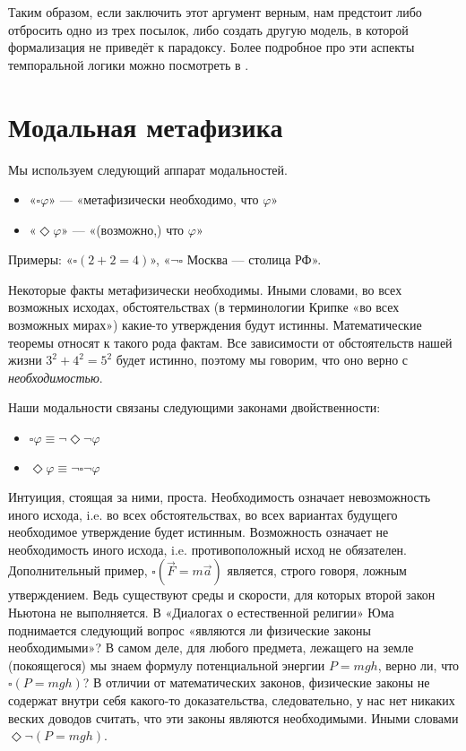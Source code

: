 \documentclass[openany]{book}
\theoremstyle{plain}
\theoremstyle{definition}
\begin{document}
Таким образом, если заключить этот аргумент верным, нам предстоит либо отбросить одно из трех посылок, либо создать другую модель, в которой формализация не приведёт к парадоксу. Более подробное про эти аспекты темпоральной логики можно посмотреть в \cite{Goranko}.

\chapter{ Модальная метафизика }

Мы используем следующий аппарат модальностей.
\begin{itemize}
\item «\(\square \varphi\)» — «метафизически необходимо, что \(\varphi\)»
\item «\(\Diamond \varphi\)» — «(возможно,) что \(\varphi\)»
\end{itemize}

Примеры: «\(\square (2+2=4)\)», «\(\neg \square\) Москва — столица РФ».

Некоторые факты метафизически необходимы. Иными словами, во всех возможных исходах, обстоятельствах (в терминологии Крипке «во всех возможных мирах») какие-то утверждения будут истинны. Математические теоремы относят к такого рода фактам. Все зависимости от обстоятельств нашей жизни \(3^2 + 4^2 = 5^2\) будет истинно, поэтому мы говорим, что оно верно с \textit{необходимостью}.

Наши модальности связаны следующими законами двойственности:
\begin{itemize}
\item \(\square \varphi \equiv \neg \Diamond \neg \varphi\)
\item \(\Diamond \varphi \equiv \neg \square \neg \varphi\)
\end{itemize}

Интуиция, стоящая за ними, проста. Необходимость означает невозможность иного исхода, i.e. во всех обстоятельствах, во всех вариантах будущего необходимое утверждение будет истинным. Возможность означает не необходимость иного исхода, i.e. противоположный исход не обязателен. Дополнительный пример, \(\square(\vec{F} = m \vec{a})\) является, строго говоря, ложным утверждением. Ведь существуют среды и скорости, для которых второй закон Ньютона не выполняется. В «Диалогах о естественной религии» Юма поднимается следующий вопрос «являются ли физические законы необходимыми»? В самом деле, для любого предмета, лежащего на земле (покоящегося) мы знаем формулу потенциальной энергии \(P = mgh\), верно ли, что \(\square(P = mgh)\)? В отличии от математических законов, физические законы не содержат внутри себя какого-то доказательства, следовательно, у нас нет никаких веских доводов считать, что эти законы являются необходимыми. Иными словами \(\Diamond \neg(P = mgh)\).
\end{document}

